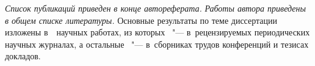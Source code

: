 {\begin{refsection}
        {\publications} \ifsynopsis\textit{Список публикаций приведен в конце автореферата. }\else\textit{Работы автора приведены в общем списке литературы. }\fi Основные результаты по теме диссертации изложены в~~научных работах, из которых~ "--- в~рецензируемых периодических научных журналах, а остальные~ "--- в~сборниках трудов конференций и тезисах докладов.
    \end{refsection}%
    \begin{refsection}
        \nocite{kiselev2026ispras}
        \nocite{kiselev2025ssdpdp}
        \nocite{kiselev2025ssdlb}
        \nocite{kiselev2024unraveling}
        \nocite{kiselev2026conf68mipt}
        \nocite{kiselev2025mmro}
        \nocite{kiselev2025conf67mipt}
        \nocite{meshkov2024convnets}
        \nocite{kiselev2024conf66mipt}
    \end{refsection}%
}